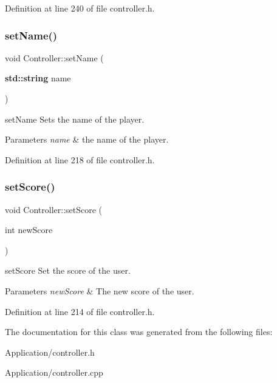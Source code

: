 Definition at line 240 of file controller.\+h.

\mbox{\label{class_controller_a177d0d6cd7cdb7784ae9c506debfa2c6}} 
\subsubsection{\texorpdfstring{set\+Name()}{setName()}}
{\footnotesize\ttfamily void Controller\+::set\+Name (\begin{DoxyParamCaption}\item[{\textbf{ std\+::string}}]{name }\end{DoxyParamCaption})\hspace{0.3cm}{\ttfamily [inline]}}



set\+Name Sets the name of the player. 


\begin{DoxyParams}{Parameters}
{\em name} & the name of the player. \\
\hline
\end{DoxyParams}


Definition at line 218 of file controller.\+h.

\mbox{\label{class_controller_af9823d858e9ed334c8d20601f1e1fb02}} 
\subsubsection{\texorpdfstring{set\+Score()}{setScore()}}
{\footnotesize\ttfamily void Controller\+::set\+Score (\begin{DoxyParamCaption}\item[{int}]{new\+Score }\end{DoxyParamCaption})\hspace{0.3cm}{\ttfamily [inline]}}



set\+Score Set the score of the user. 


\begin{DoxyParams}{Parameters}
{\em new\+Score} & The new score of the user. \\
\hline
\end{DoxyParams}


Definition at line 214 of file controller.\+h.



The documentation for this class was generated from the following files\+:\begin{DoxyCompactItemize}
\item 
Application/controller.\+h\item 
Application/controller.\+cpp\end{DoxyCompactItemize}
